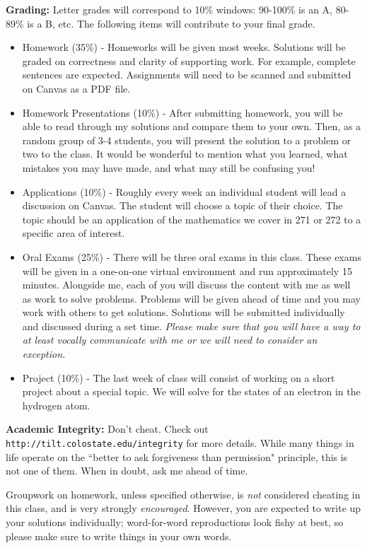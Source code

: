 \documentclass[12pt]{amsbook}
\begin{document}
\textbf{Grading:} Letter grades will correspond to 10\% windows: 90-100\% is an A, 80-89\% is a B, etc. The following items will contribute to your final grade.
\begin{itemize}
\item Homework (35\%) - Homeworks will be given most weeks. Solutions will be graded on correctness and clarity of supporting work. For example, complete sentences are expected. Assignments will need to be scanned and submitted on Canvas as a PDF file.
\item Homework Presentations (10\%) - After submitting homework, you will be able to read through my solutions and compare them to your own. Then, as a random group of 3-4 students, you will present the solution to a problem or two to the class. It would be wonderful to mention what you learned, what mistakes you may have made, and what may still be confusing you!
\item Applications (10\%) - Roughly every week an individual student will lead a discussion on Canvas. The student will choose a topic of their choice. The topic should be an application of the mathematics we cover in 271 or 272 to a specific area of interest.
\item Oral Exams (25\%) - There will be three oral exams in this class. These exams will be given in a one-on-one virtual environment and run approximately 15 minutes.  Alongside me, each of you will discuss the content with me as well as work to solve problems. Problems will be given ahead of time and you may work with others to get solutions.  Solutions will be submitted individually and discussed during a set time. \emph{Please make sure that you will have a way to at least vocally communicate with me or we will need to consider an exception.}
\item Project (10\%) - The last week of class will consist of working on a short project about a special topic.  We will solve for the states of an electron in the hydrogen atom.
\end{itemize}

\textbf{Academic Integrity:} Don't cheat. Check out \texttt{http://tilt.colostate.edu/integrity} for more details. While many things in life operate on the ``better to ask forgiveness than permission" principle, this is not one of them. When in doubt, ask me ahead of time.

Groupwork on homework, unless specified otherwise, is \emph{not} considered cheating in this class, and is very strongly \emph{encouraged}. However, you are expected to write up your solutions individually; word-for-word reproductions look fishy at best, so please make sure to write things in your own words.
\end{document}

